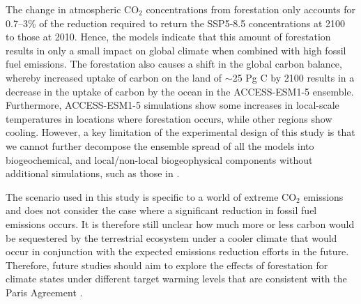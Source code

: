 \documentclass[draft]{agujournal2019}
\begin{document}
The change in atmospheric CO$_2$ concentrations from forestation only accounts for 0.7--3\% of the reduction required to return the SSP5-8.5 concentrations at 2100 to those at 2010.
Hence, the models indicate that this amount of forestation results in only a small impact on global climate when combined with high fossil fuel emissions.
The forestation also causes a shift in the global carbon balance, whereby increased uptake of carbon on the land of $\sim$25 Pg C by 2100 results in a decrease in the uptake of carbon by the ocean in the ACCESS-ESM1-5 ensemble.
Furthermore, ACCESS-ESM1-5 simulations show some increases in local-scale temperatures in locations where forestation occurs, while other regions show cooling.
However, a key limitation of the experimental design of this study is that we cannot further decompose the ensemble spread of all the models into biogeochemical, and local/non-local biogeophysical components without additional simulations, such as those in .

The scenario used in this study is specific to a world of extreme CO$_2$ emissions and does not consider the case where a significant reduction in fossil fuel emissions occurs.
It is therefore still unclear how much more or less carbon would be sequestered by the terrestrial ecosystem under a cooler climate that would occur in conjunction with the expected emissions reduction efforts in the future.
Therefore, future studies should aim to explore the effects of forestation for climate states under different target warming levels that are consistent with the Paris Agreement \cite <for example>{king_studying_2021}.
\end{document}
